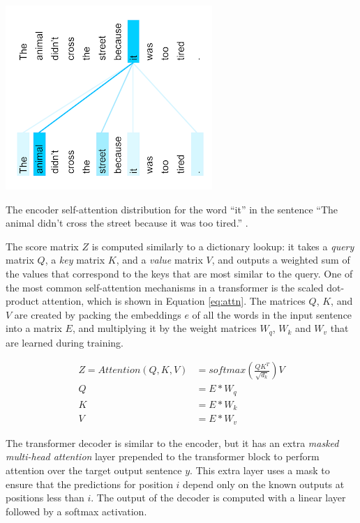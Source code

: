 \begin{table}[h]
    \centering
    \includegraphics[width=0.5\columnwidth]{imgs/background/attn.png}
    \caption{The encoder self-attention distribution for the word ``it'' in the sentence
    ``The animal didn't cross the street because it was too tired.'' \cite{vaswani2017attention}.}
    \label{fig:attn}
\end{table}

The score matrix $Z$ is computed similarly to a dictionary lookup: it takes a \textit{query} matrix $Q$, a \textit{key} matrix $K$, and a \textit{value} matrix $V$, and outputs a weighted sum of the values that correspond to the keys that are most similar to the query. One of the most common self-attention mechanisms in a transformer is the scaled dot-product attention, which is shown in Equation \ref{eq:attn}. The matrices $Q$, $K$, and $V$ are created by packing the embeddings $e$ of all the words in the input sentence into a matrix $E$, and multiplying it by the weight matrices $W_q$, $W_k$ and $W_v$ that are learned during training.

\begin{equation}\label{eq:attn}
\begin{split}
    Z = Attention(Q, K, V) &= softmax(\frac{QK^T}{\sqrt{d_k}})V \\
    Q &= E * W_q \\
    K &= E * W_k \\
    V &= E * W_v
\end{split}
\end{equation}

The transformer decoder is similar to the encoder, but it has an extra \textit{masked multi-head attention} layer prepended to the transformer block to perform attention over the target output sentence $y$. This extra layer uses a mask to ensure that the predictions for position $i$ depend only on the known outputs at positions less than $i$. The output of the decoder is computed with a linear layer followed by a softmax activation.

